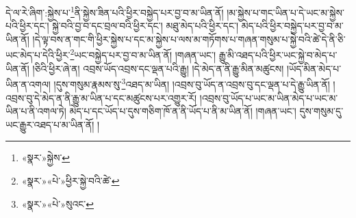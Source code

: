 དེ་ལ་རེ་ཞིག་:སྐྱེས་པ་\footnote{«སྣར་»སྐྱེས་}ནི་སྐྱེས་ཟིན་པའི་ཕྱིར་བསྐྱེད་པར་བྱ་བ་མ་ཡིན་ནོ། །མ་སྐྱེས་པ་གང་ཡིན་པ་དེ་ཡང་མ་སྐྱེས་པའི་ཕྱིར་དང་། སྐྱེ་བའི་བྱ་བ་དང་བྲལ་བའི་ཕྱིར་དང་། མཐུ་མེད་པའི་ཕྱིར་དང་། མེད་པའི་ཕྱིར་བསྐྱེད་པར་བྱ་བ་མ་ཡིན་ནོ། །དེ་ལྟ་བས་ན་གང་གི་ཕྱིར་སྐྱེས་པ་དང་མ་སྐྱེས་པ་ལས་མ་གཏོགས་པ་གཞན་གསུམ་པ་སྐྱེ་བའི་ཚེ་དེ་ནི་ཅི་ཡང་མེད་པ་དེའི་ཕྱིར་\footnote{«སྣར་»«པེ་»ཕྱིར་སྐྱེ་བའི་ཚེ་}ཡང་བསྐྱེད་པར་བྱ་བ་མ་ཡིན་ནོ། །གཞན་ཡང་། རྒྱུ་མི་འཐད་པའི་ཕྱིར་ཡང་སྐྱེ་བ་མེད་པ་ཡིན་ནོ། །ཅིའི་ཕྱིར་ཞེ་ན། འབྲས་ཡོད་འབྲས་དང་ལྡན་པའི་རྒྱུ། །དེ་མེད་ན་ནི་རྒྱུ་མིན་མཚུངས། །ཡོད་མིན་མེད་པ་ཡིན་ན་འགལ། །དུས་གསུམ་རྣམས་སུ་\footnote{«སྣར་»«པེ་»སུའང་}འཐད་མ་ཡིན། །འབྲས་བུ་ཡོད་ན་འབྲས་བུ་དང་ལྡན་པ་དེ་རྒྱུ་ཡིན་ནོ། །འབྲས་བུ་དེ་མེད་ན་ནི་རྒྱུ་མ་ཡིན་པ་དང་མཚུངས་པར་འགྱུར་རོ། །འབྲས་བུ་ཡོད་པ་ཡང་མ་ཡིན་མེད་པ་ཡང་མ་ཡིན་པ་ནི་འགལ་ཏེ། མེད་པ་དང་ཡོད་པ་དུས་གཅིག་ཁོ་ན་ནི་ཡོད་པ་ནི་མ་ཡིན་ནོ། །གཞན་ཡང་། དུས་གསུམ་དུ་ཡང་རྒྱུར་འཐད་པ་མ་ཡིན་ནོ། །
